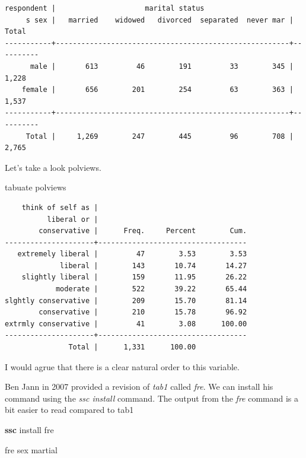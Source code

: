 \documentclass[
]{book}
\newenvironment{Shaded}{\begin{snugshade}}{\end{snugshade}}
\newcommand{\KeywordTok}[1]{\textcolor[rgb]{0.13,0.29,0.53}{\textbf{#1}}}
\newcommand{\NormalTok}[1]{#1}
\begin{document}
\begin{verbatim}
respondent |                     marital status
     s sex |   married    widowed   divorced  separated  never mar |     Total
-----------+-------------------------------------------------------+----------
      male |       613         46        191         33        345 |     1,228 
    female |       656        201        254         63        363 |     1,537 
-----------+-------------------------------------------------------+----------
     Total |     1,269        247        445         96        708 |     2,765 
\end{verbatim}

Let's take a look polviews.

\begin{Shaded}
\begin{Highlighting}[]
\NormalTok{tabuate polviews}
\end{Highlighting}
\end{Shaded}

\begin{verbatim}
    think of self as |
          liberal or |
        conservative |      Freq.     Percent        Cum.
---------------------+-----------------------------------
   extremely liberal |         47        3.53        3.53
             liberal |        143       10.74       14.27
    slightly liberal |        159       11.95       26.22
            moderate |        522       39.22       65.44
slghtly conservative |        209       15.70       81.14
        conservative |        210       15.78       96.92
extrmly conservative |         41        3.08      100.00
---------------------+-----------------------------------
               Total |      1,331      100.00
\end{verbatim}

I would agrue that there is a clear natural order to this variable.

Ben Jann in 2007 provided a revision of \emph{tab1} called \emph{fre}. We can install his command using the \emph{ssc install} command. The output from the \emph{fre} command is a bit easier to read compared to tab1

\begin{Shaded}
\begin{Highlighting}[]
\KeywordTok{ssc}\NormalTok{ install fre}
\end{Highlighting}
\end{Shaded}

\begin{Shaded}
\begin{Highlighting}[]
\NormalTok{fre sex martial}
\end{Highlighting}
\end{Shaded}
\end{document}
